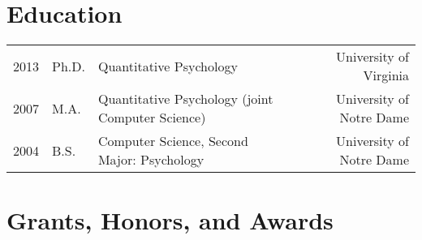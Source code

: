 \documentclass[11pt]{article}
\begin{document}
\section*{Education}
\begin{tabularx}{\textwidth}{llXr}
2013	& Ph.D.		& Quantitative Psychology                     					& University of Virginia\\
2007 	& M.A.		& Quantitative Psychology (joint Computer Science)	& University of Notre Dame\\
2004 	& B.S.		& Computer Science, Second Major: Psychology    		& University of Notre Dame\\
\end{tabularx}

\section*{Grants, Honors, and Awards}
\end{document}
